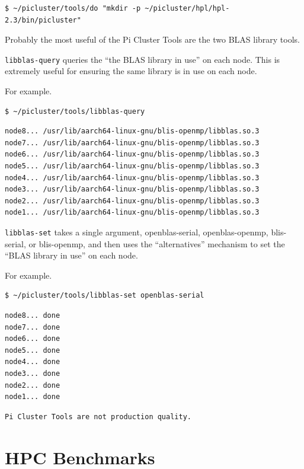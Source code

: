 \documentclass{report}
\begin{document}
\lstset{style=type}
\begin{lstlisting}
$ ~/picluster/tools/do "mkdir -p ~/picluster/hpl/hpl-2.3/bin/picluster"
\end{lstlisting}


Probably the most useful of the Pi Cluster Tools are the two BLAS library tools.

\verb|libblas-query| queries the ``the BLAS library in use'' on each node. This is extremely useful for ensuring the same library is in use on each node.

For example.

\lstset{style=type}
\begin{lstlisting}
$ ~/picluster/tools/libblas-query
\end{lstlisting}

\lstset{style=term}
\begin{lstlisting}
node8... /usr/lib/aarch64-linux-gnu/blis-openmp/libblas.so.3
node7... /usr/lib/aarch64-linux-gnu/blis-openmp/libblas.so.3
node6... /usr/lib/aarch64-linux-gnu/blis-openmp/libblas.so.3
node5... /usr/lib/aarch64-linux-gnu/blis-openmp/libblas.so.3
node4... /usr/lib/aarch64-linux-gnu/blis-openmp/libblas.so.3
node3... /usr/lib/aarch64-linux-gnu/blis-openmp/libblas.so.3
node2... /usr/lib/aarch64-linux-gnu/blis-openmp/libblas.so.3
node1... /usr/lib/aarch64-linux-gnu/blis-openmp/libblas.so.3
\end{lstlisting}


\verb|libblas-set| takes a single argument, openblas-serial, openblas-openmp, blis-serial, or blis-openmp, and then uses the ``alternatives'' mechanism to set the ``BLAS library in use'' on each node.

For example.

\lstset{style=type}
\begin{lstlisting}
$ ~/picluster/tools/libblas-set openblas-serial
\end{lstlisting}

\lstset{style=term}
\begin{lstlisting}
node8... done
node7... done 
node6... done 
node5... done 
node4... done 
node3... done 
node2... done 
node1... done 
\end{lstlisting}

\lstset{style=hack}
\begin{lstlisting}
Pi Cluster Tools are not production quality.
\end{lstlisting}



%
%
\chapter{HPC Benchmarks}
\end{document}
